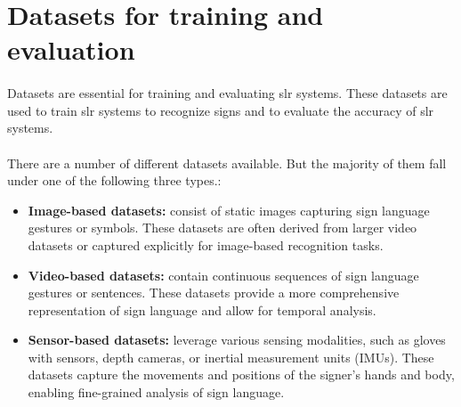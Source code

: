 \section{Datasets for training and evaluation}
\paragraph{}
Datasets are essential for training and evaluating \ac{slr} systems. These datasets are used to train \ac{slr} systems to recognize signs and to evaluate the accuracy of \ac{slr} systems.
\paragraph{}
There are a number of different datasets available. But the majority of them fall under one of the following three types.:
\begin{itemize}
	\item \textbf{Image-based datasets:} consist of static images capturing sign language gestures or symbols. These datasets are often derived from larger video datasets or captured explicitly for image-based recognition tasks.
	\item \textbf{Video-based datasets:} contain continuous sequences of sign language gestures or sentences. These datasets provide a more comprehensive representation of sign language and allow for temporal analysis.
	\item \textbf{Sensor-based datasets:} leverage various sensing modalities, such as gloves with sensors, depth cameras, or inertial measurement units (IMUs). These datasets capture the movements and positions of the signer's hands and body, enabling fine-grained analysis of sign language.
\end{itemize}

